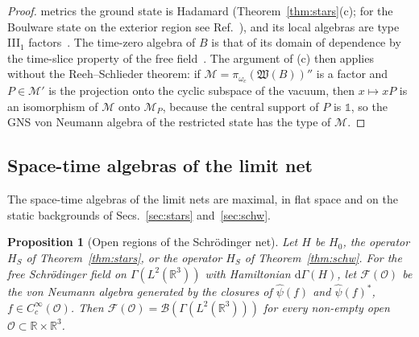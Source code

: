 \documentclass[%
 aip,
 jmp,
 amsmath,amssymb,
 reprint, onecolumn
]{revtex4-1}
\newtheorem{proposition}{Proposition}
\theoremstyle{definition}
\theoremstyle{remark}
\newcommand{\R}{\mathbb{R}}
\newcommand{\F}{\mathcal{F}}
\newcommand{\Op}{\mathcal{O}}
\newcommand{\one}{\mathds{1}}
\newcommand{\rmd}{\mathrm{d}}
\begin{document}
\begin{proof}
metrics the ground state is Hadamard (Theorem~\ref{thm:stars}(c); for
the Boulware state on the exterior region see
Ref.~), and its local algebras are type
III$_1$ factors~\cite{Verch1997}. The time-zero algebra of $B$ is that of
its domain of dependence by the time-slice property of the free
field~\cite{Dimock1980}.
The argument of (c) then applies without the Reeh--Schlieder theorem: if
$\mathcal M=\pi_{\omega_c}(\mathfrak W(B))''$ is a factor and $P\in
\mathcal M'$ is the projection onto the cyclic subspace of the vacuum,
then $x\mapsto xP$ is an isomorphism of $\mathcal M$ onto $\mathcal M_P$,
because the central support of $P$ is $\one$, so the GNS von Neumann
algebra of the restricted state has the type of $\mathcal M$.
\end{proof}

\subsection{Space-time algebras of the limit net}\label{sec:open-regions}

The space-time algebras of the limit nets are maximal, in flat space and
on the static backgrounds of Secs.~\ref{sec:stars} and~\ref{sec:schw}.

\begin{proposition}[Open regions of the Schr\"odinger net]
\label{prop:open-regions}
Let $H$ be $H_0$, the operator $H_S$ of Theorem~\ref{thm:stars}, or the
operator $H_S$ of Theorem~\ref{thm:schw}. For the free Schr\"odinger
field on $\Gamma(L^2(\R^3))$ with Hamiltonian $\rmd\Gamma(H)$, let
$\F(\Op)$ be the von Neumann algebra generated by the closures of
$\hat\psi(f)$ and $\hat\psi(f)^*$, $f\in C_c^\infty(\Op)$. Then
$\F(\Op)=\mathcal{B}(\Gamma(L^2(\R^3)))$ for every non-empty open
$\Op\subset\R\times\R^3$.
\end{proposition}
\end{document}
